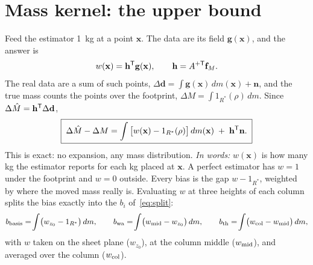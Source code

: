 \documentclass[11pt]{article}
\newcommand{\words}[1]{\emph{In words:} #1}
\begin{document}
\section*{Mass kernel: the upper bound}
Feed the estimator 1~kg at a point $\mathbf x$. The data are its field
$\mathbf g(\mathbf x)$, and the answer is
\begin{equation}
  w(\mathbf x)=\mathbf h^{\sf T}\mathbf g(\mathbf x),\qquad
  \mathbf h=A^{+\sf T}\mathbf f_M .
\end{equation}
The real data are a sum of such points,
$\Delta\mathbf d=\int\mathbf g(\mathbf x)\,dm(\mathbf x)+\mathbf n$, and the
true mass counts the points over the footprint,
$\Delta M=\int1_{R^*}(\rho)\,dm$. Since $\Delta\hat M=\mathbf h^{\sf T}\Delta\mathbf d$,
\begin{equation}
  \boxed{\;\Delta\hat M-\Delta M=\int\big[w(\mathbf x)-1_{R^*}(\rho)\big]\,dm(\mathbf x)
  \;+\;\mathbf h^{\sf T}\mathbf n .\;}
  \label{eq:kernel}
\end{equation}
This is exact: no expansion, any mass distribution.
\words{$w(\mathbf x)$ is how many kg the estimator reports for each kg placed
at $\mathbf x$. A perfect estimator has $w=1$ under the footprint and $w=0$
outside. Every bias is the gap $w-1_{R^*}$, weighted by where the moved mass
really is.} Evaluating $w$ at three heights of each column splits the bias
exactly into the $b_i$ of~\eqref{eq:split}:
\begin{equation}
  b_{\rm basis}=\!\int\!\big(w_{z_0}-1_{R^*}\big)\,dm,\qquad
  b_{\rm wa}=\!\int\!\big(w_{\rm mid}-w_{z_0}\big)\,dm,\qquad
  b_{\rm th}=\!\int\!\big(w_{\rm col}-w_{\rm mid}\big)\,dm,
  \label{eq:bi}
\end{equation}
with $w$ taken on the sheet plane ($w_{z_0}$), at the column middle
($w_{\rm mid}$), and averaged over the column ($w_{\rm col}$).
\end{document}
